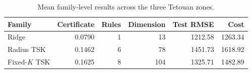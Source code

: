 \begin{table}[t]
\centering
\caption{Mean family-level results across the three Tetouan zones.}
\label{tab:energy_families_v3}
\begin{tabular}{lrrrrr}
\hline
Family & Certificate & Rules & Dimension & Test RMSE & Cost \\
\hline
Ridge & 0.0790 & 1 & 13 & 1212.58 & 1263.34 \\
Radius TSK & 0.1462 & 6 & 78 & 1451.73 & 1618.92 \\
Fixed-$K$ TSK & 0.1625 & 8 & 104 & 1325.71 & 1482.89 \\
\hline
\end{tabular}
\end{table}
